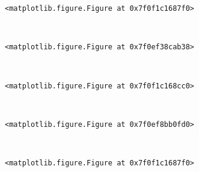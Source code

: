 \documentclass[11pt]{article}
\begin{document}
    
    \begin{verbatim}
<matplotlib.figure.Figure at 0x7f0f1c1687f0>
    \end{verbatim}

    
    \begin{center}
    \end{center}
    { \hspace*{\fill} \\}
    
    
    \begin{verbatim}
<matplotlib.figure.Figure at 0x7f0ef38cab38>
    \end{verbatim}

    
    \begin{center}
    \end{center}
    { \hspace*{\fill} \\}
    
    
    \begin{verbatim}
<matplotlib.figure.Figure at 0x7f0f1c168cc0>
    \end{verbatim}

    
    \begin{center}
    \end{center}
    { \hspace*{\fill} \\}
    
    
    \begin{verbatim}
<matplotlib.figure.Figure at 0x7f0ef8bb0fd0>
    \end{verbatim}

    
    \begin{center}
    \end{center}
    { \hspace*{\fill} \\}
    
    
    \begin{verbatim}
<matplotlib.figure.Figure at 0x7f0f1c1687f0>
    \end{verbatim}

    
    \begin{center}
    \end{center}
    { \hspace*{\fill} \\}
    
\end{document}
